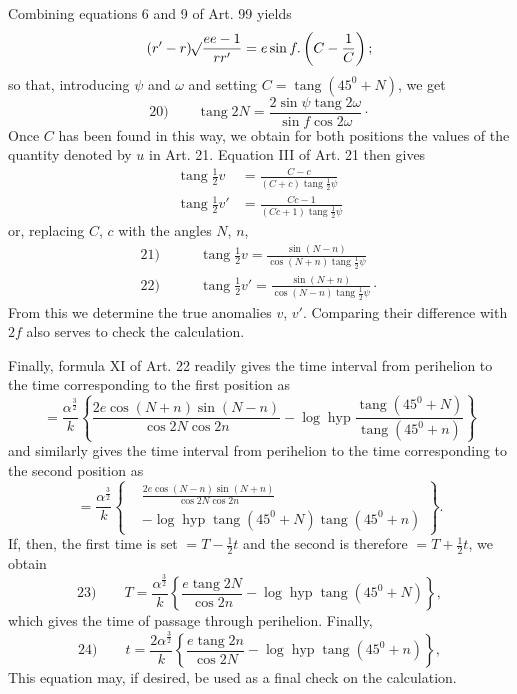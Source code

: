 \par
Combining equations 6 and 9 of Art. 99 yields
\[
(r'-r)\mathord{{}^{}\!\surd}\frac{ee-1}{rr'}=e\sin f\mathpunct{.}\left(C-\frac1C\right);
\]
\noindent so that, introducing $\psi$ and $\omega$ and setting $C=\operatorname{tang}(45^0+N)$, we get
\[
\mathrm{20)}\qquad\operatorname{tang}2N=\frac{2\sin\psi\operatorname{tang}2\omega}{\sin f\cos2\omega}\mathpunct{\cdot}
\]
\noindent Once $C$ has been found in this way, we obtain for both positions the values of the quantity denoted by $u$ in Art. 21. Equation III of Art. 21 then gives
\[
\begin{aligned}
\operatorname{tang}\tfrac12v&=\frac{C-c}{(C+c)\operatorname{tang}\tfrac12\psi}\\[.6em]
\operatorname{tang}\tfrac12v'&=\frac{Cc-1}{(Cc+1)\operatorname{tang}\tfrac12\psi}
\end{aligned}
\]
\noindent or, replacing $C$, $c$ with the angles $N$, $n$,
\[
\begin{aligned}
\mathrm{21)}\qquad&\operatorname{tang}\tfrac12v=\frac{\sin(N-n)}{\cos(N+n)\operatorname{tang}\tfrac12\psi}\\[.6em]
\mathrm{22)}\qquad&\operatorname{tang}\tfrac12v'=\frac{\sin(N+n)}{\cos(N-n)\operatorname{tang}\tfrac12\psi}\mathpunct{\cdot}
\end{aligned}
\]
\noindent From this we determine the true anomalies $v$, $v'$. Comparing their difference with $2f$ also serves to check the calculation.
\par
Finally, formula XI of Art. 22 readily gives the time interval from perihelion to the time corresponding to the first position as
\[
=\frac{\alpha^{\frac32}}k\left\{\frac{2e\cos(N+n)\sin(N-n)}{\cos2N\cos2n}-\log\operatorname{hyp}\frac{\operatorname{tang}(45^0+N)}{\operatorname{tang}(45^0+n)}\right\}
\]
\noindent and similarly gives the time interval from perihelion to the time corresponding to the second position as
\[
=\frac{\alpha^{\frac32}}k\left\{\begin{aligned}&\frac{2e\cos(N-n)\sin(N+n)}{\cos2N\cos2n}\\[.5em]&-\log\operatorname{hyp}\operatorname{tang}(45^0+N)\operatorname{tang}(45^0+n)\end{aligned}\right\}.
\]
\noindent If, then, the first time is set $=T-\tfrac12t$ and the second is therefore $=T+\tfrac12t$, we obtain
\[
\mathrm{23)}\qquad T=\frac{\alpha^{\frac32}}k\left\{\frac{e\operatorname{tang}2N}{\cos2n}-\log\operatorname{hyp}\operatorname{tang}(45^0+N)\right\},
\]
\noindent{}which gives the time of passage through perihelion. Finally,
\[
\mathrm{24)}\qquad t=\frac{2\alpha^{\frac32}}k\left\{\frac{e\operatorname{tang}2n}{\cos2N}-\log\operatorname{hyp}\operatorname{tang}(45^0+n)\right\},
\]
\noindent This equation may, if desired, be used as a final check on the calculation.
